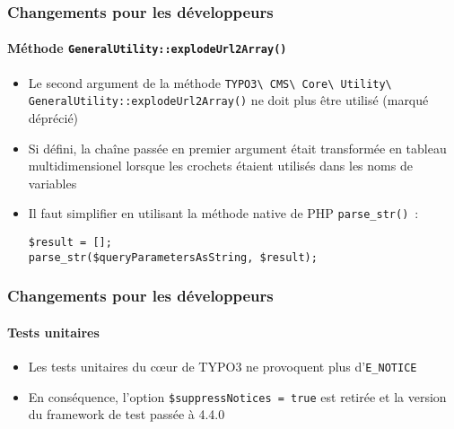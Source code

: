\begin{frame}[fragile]
	\frametitle{Changements pour les développeurs}
	\framesubtitle{Méthode \texttt{GeneralUtility::explodeUrl2Array()}}

	\begin{itemize}
		\item Le second argument de la méthode
			\smaller
				\texttt{TYPO3\textbackslash
					CMS\textbackslash
					Core\textbackslash
					Utility\textbackslash
					GeneralUtility::explodeUrl2Array()}\newline
			\normalsize
			ne doit plus être utilisé (marqué déprécié)

		\item Si défini, la chaîne passée en premier argument était transformée
			en tableau multidimensionel lorsque les crochets étaient utilisés dans les
			noms de variables
		\item Il faut simplifier en utilisant la méthode native de PHP \texttt{parse\_str()}~:

			\begin{lstlisting}
$result = [];
parse_str($queryParametersAsString, $result);
			\end{lstlisting}

	\end{itemize}

\end{frame}


\begin{frame}[fragile]
	\frametitle{Changements pour les développeurs}
	\framesubtitle{Tests unitaires}

	\begin{itemize}
		\item Les tests unitaires du cœur de TYPO3 ne provoquent plus d'\texttt{E\_NOTICE}
		\item En conséquence, l'option \texttt{\$suppressNotices = true} est retirée et la version
			du framework de test passée à 4.4.0

	\end{itemize}

\end{frame}

